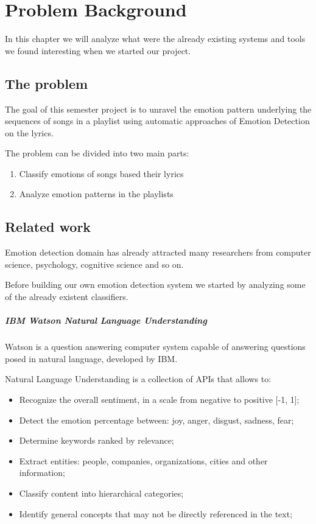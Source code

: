\chapter{Problem Background}

In this chapter we will analyze what were the already existing systems and tools we found interesting when we started our project.

\section{The problem}
The goal of this semester project is to unravel the emotion pattern underlying the sequences of songs in a playlist using automatic approaches of Emotion Detection on the lyrics.\par
The problem can be divided into two main parts:
\begin{enumerate}
\item Classify emotions of songs based their lyrics
\item Analyze emotion patterns in the playlists
\end{enumerate}

\section{Related work}
Emotion detection domain has already attracted many researchers from computer science, psychology, cognitive science and so on. \par
Before building our own emotion detection system we started by analyzing some of the already existent classifiers. \par
\paragraph{IBM Watson Natural Language Understanding}\cite{ibm_watson}
Watson is a question answering computer system capable of answering questions posed in natural language, developed by IBM.\par
Natural Language Understanding is a collection of APIs that allows to:
\begin{itemize}
\item Recognize the overall sentiment, in a scale from negative to positive [-1, 1];
\item Detect the emotion percentage between: joy, anger, disgust, sadness, fear;
\item Determine keywords ranked by relevance;
\item Extract entities: people, companies, organizations, cities and other information;
\item Classify content into hierarchical categories;
\item Identify general concepts that may not be directly referenced in the text; 
\end{itemize}

